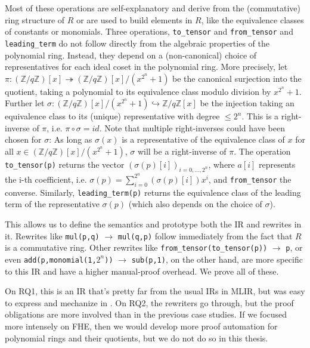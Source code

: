 Most of these operations are self-explanatory and derive from the (commutative) ring structure of $R$ or are used to build elements in $R$, like the equivalence classes of constants or monomials.
Three operations, \texttt{to\_tensor} and \texttt{from\_tensor} and \texttt{leading\_term} do not follow directly from the algebraic properties of the polynomial ring.
Instead, they depend on a (non-canonical) choice of representatives for each ideal coset in the polynomial ring.
More precisely, let $\pi: (\mathbb{Z}/q\mathbb{Z})[x] \twoheadrightarrow (\mathbb{Z}/q\mathbb{Z})[x]/(x^{2^n} + 1)$ be the canonical surjection into the quotient, taking a polynomial to its equivalence class modulo division by $x^{2^{n}} + 1$.
Further let $\sigma: (\mathbb{Z}/q\mathbb{Z})[x]/(x^{2^n} + 1) \hookrightarrow \mathbb{Z}/q\mathbb{Z}[x]$ be the injection taking an equivalence class to its (unique) representative with degree $\leq 2^{n}$.
This is a right-inverse of $\pi$, i.e. $\pi \circ \sigma = id$.
Note that multiple right-inverses could have been chosen for $\sigma$:
As long as $\sigma(x)$ is a representative of the equivalence class of $x$ for all $x\in (\mathbb{Z}/q\mathbb{Z})[x]/(x^{2^n} + 1)$, $\sigma$ will be a right-inverse of $\pi$.
The operation \texttt{to\_tensor(p)} returns the vector $(\sigma(p)[i])_{i=0,\ldots,2^n}$, where $a[i]$ represents the i-th coefficient, i.e. $\sigma(p) = \sum_{i=0}^{2^{n}} (\sigma(p)[i]) x^{i}$, and \texttt{from\_tensor} the converse.
Similarly, \texttt{leading\_term(p)} returns the equivalence class of the leading term of the representative $\sigma(p)$ (which also depends on the choice of $\sigma$).

This allows us to define the semantics and prototype both the IR and rewrites in it.
Rewrites like \texttt{mul(p,q)} $\rightarrow$ \texttt{mul(q,p)} follow immediately from the fact that $R$ is a commutative ring.
Other rewrites like \texttt{from\_tensor(to\_tensor(p))} $\rightarrow$ \texttt{p}, or even \texttt{add(p,monomial(1,$2^n$))} $\rightarrow$ \texttt{sub(p,1)}, on the other hand, are more specific to this IR and have a higher manual-proof overhead.
We prove all of these.

On RQ1, this is an IR that's pretty far from the usual IRs in MLIR,
but was easy to express and mechanize in .
On RQ2, the rewriters go through, but the proof obligations are more involved than in the previous case studies.
If we focused more intensely on FHE, then we would develop more proof automation for polynomial rings and their quotients,
but we do not do so in this thesis.

